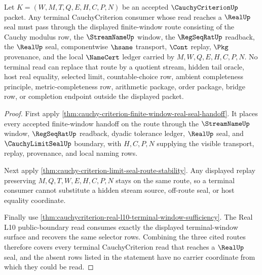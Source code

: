 \begin{theorem}
\label{thm:cauchycriterion-finite-window-terminal-coverage}
Let $K=(W,M,T,Q,E,H,C,P,N)$ be an accepted $\CauchyCriterionUp$ packet. Any
terminal CauchyCriterion consumer whose read reaches a $\RealUp$ seal must pass
through the displayed finite-window route consisting of the Cauchy modulus row,
the $\StreamNameUp$ window, the $\RegSeqRatUp$ readback, the $\RealUp$ seal,
componentwise $\hsame$ transport, $\Cont$ replay, $\Pkg$ provenance, and the
local $\NameCert$ ledger carried by $M,W,Q,E,H,C,P,N$. No terminal read can
replace that route by a quotient stream, hidden tail oracle, host real
equality, selected limit, countable-choice row, ambient completeness principle,
metric-completeness row, arithmetic package, order package, bridge row, or
completion endpoint outside the displayed packet.
\end{theorem}
\begin{proof}
First apply \autoref{thm:cauchy-criterion-finite-window-real-seal-handoff}.
It places every accepted finite-window handoff on the route through the
$\StreamNameUp$ window, $\RegSeqRatUp$ readback, dyadic tolerance ledger,
$\RealUp$ seal, and $\CauchyLimitSealUp$ boundary, with $H,C,P,N$ supplying the
visible transport, replay, provenance, and local naming rows.

Next apply \autoref{thm:cauchy-criterion-limit-seal-route-stability}. Any
displayed replay preserving $M,Q,T,W,E,H,C,P,N$ stays on the same route, so a
terminal consumer cannot substitute a hidden stream source, off-route seal, or
host equality coordinate.

Finally use
\autoref{thm:cauchycriterion-real-l10-terminal-window-sufficiency}. The Real
L10 public-boundary read consumes exactly the displayed terminal-window
surface and recovers the same selector rows. Combining the three cited routes
therefore covers every terminal CauchyCriterion read that reaches a $\RealUp$
seal, and the absent rows listed in the statement have no carrier coordinate
from which they could be read.
\end{proof}

